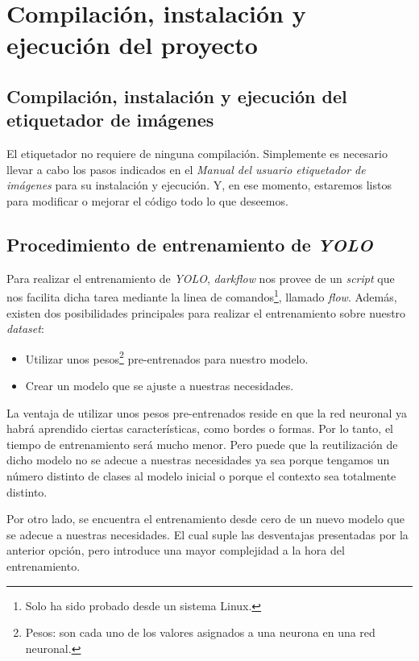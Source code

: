 \section{Compilación, instalación y ejecución del proyecto}

\subsection{Compilación, instalación y ejecución del  etiquetador de imágenes}
El etiquetador no requiere de ninguna compilación. Simplemente es necesario llevar a cabo los pasos indicados en el \textit{\textit{Manual del usuario etiquetador de imágenes}} para su instalación y ejecución. Y, en ese momento, estaremos listos para modificar o mejorar el código todo lo que deseemos.

\subsection{Procedimiento de entrenamiento de \textit{YOLO}}

Para realizar el entrenamiento de \textit{YOLO}, \textit{darkflow} nos provee de un \textit{script} que nos facilita dicha tarea mediante la linea de comandos\footnote{ Solo ha sido probado desde un sistema Linux.}, llamado \textit{flow}. Además, existen dos posibilidades principales para realizar el entrenamiento sobre nuestro \textit{dataset}:

\begin{itemize}
	\item Utilizar unos pesos\footnote{Pesos: son cada uno de los valores asignados a una neurona en una red neuronal.} pre-entrenados para nuestro modelo.
	\item Crear un modelo que se ajuste a nuestras necesidades.
\end{itemize}

La ventaja de utilizar unos pesos pre-entrenados reside en que la red neuronal ya habrá aprendido ciertas características, como bordes o formas. Por lo tanto, el tiempo de entrenamiento será mucho menor. Pero puede que la reutilización de dicho modelo no se adecue a nuestras necesidades ya sea porque tengamos un número distinto de clases al modelo inicial o porque el contexto sea totalmente distinto.

Por otro lado, se encuentra el entrenamiento desde cero de un nuevo modelo que se adecue a nuestras necesidades. El cual suple las desventajas presentadas por la anterior opción, pero introduce una mayor complejidad a la hora del entrenamiento.

